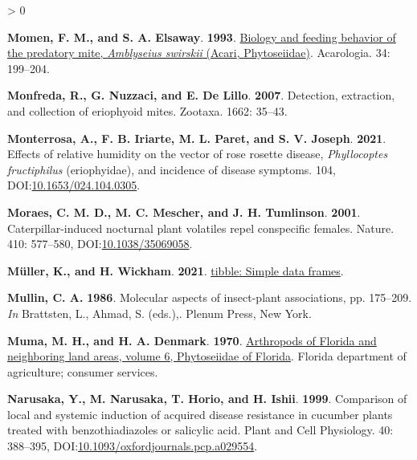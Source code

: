 \documentclass{ufdissertation}[overrideChapters] %
\newlength{\cslhangindent}
\newenvironment{CSLReferences}[2] %
 {%
  \setlength{\parindent}{0pt}
  \ifodd #1 \everypar{\setlength{\hangindent}{\cslhangindent}}\ignorespaces\fi
  \ifnum #2 > 0
  \setlength{\parskip}{#2\baselineskip}
  \fi
 }%
 {}
\begin{document}
{\begin{CSLReferences}{1}{1}
\leavevmode{}%
\textbf{Momen, F. M., and S. A. Elsaway}. \textbf{1993}. \href{http://www1.montpellier.inra.fr/CBGP/acarologia/article.php?id=2349}{Biology and feeding behavior of the predatory mite, {\emph{Amblyseius swirskii}} ({Acari}, {Phytoseiidae})}. Acarologia. 34: 199--204.

\leavevmode{}%
\textbf{Monfreda, R., G. Nuzzaci, and E. De Lillo}. \textbf{2007}. Detection, extraction, and collection of eriophyoid mites. Zootaxa. 1662: 35--43.

\leavevmode{}%
\textbf{Monterrosa, A., F. B. Iriarte, M. L. Paret, and S. V. Joseph}. \textbf{2021}. Effects of relative humidity on the vector of rose rosette disease, {\emph{Phyllocoptes fructiphilus}} (eriophyidae), and incidence of disease symptoms. 104, DOI:\href{https://doi.org/10.1653/024.104.0305}{10.1653/024.104.0305}.

\leavevmode{}%
\textbf{Moraes, C. M. D., M. C. Mescher, and J. H. Tumlinson}. \textbf{2001}. Caterpillar-induced nocturnal plant volatiles repel conspecific females. Nature. 410: 577--580, DOI:\href{https://doi.org/10.1038/35069058}{10.1038/35069058}.

\leavevmode{}%
\textbf{Müller, K., and H. Wickham}. \textbf{2021}. \href{https://CRAN.R-project.org/package=tibble}{{tibble}: Simple data frames}.

\leavevmode{}%
\textbf{Mullin, C. A.} \textbf{1986}. Molecular aspects of insect-plant associations, pp. 175--209. \emph{In} Brattsten, L., Ahmad, S. (eds.),. Plenum Press, New York.

\leavevmode{}%
\textbf{Muma, M. H., and H. A. Denmark}. \textbf{1970}. \href{https://ufdc.ufl.edu/AA00000576/00001}{Arthropods of {Florida} and neighboring land areas, volume 6, {Phytoseiidae} of {Florida}}. Florida department of agriculture; consumer services.

\leavevmode{}%
\textbf{Narusaka, Y., M. Narusaka, T. Horio, and H. Ishii}. \textbf{1999}. Comparison of local and systemic induction of acquired disease resistance in cucumber plants treated with benzothiadiazoles or salicylic acid. Plant and Cell Physiology. 40: 388--395, DOI:\href{https://doi.org/10.1093/oxfordjournals.pcp.a029554}{10.1093/oxfordjournals.pcp.a029554}.


\end{CSLReferences}}
\end{document}
